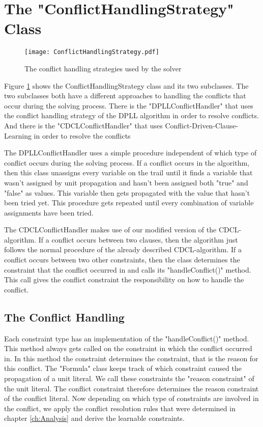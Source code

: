 \section{The "ConflictHandlingStrategy" Class}

\begin{figure}[htbp]
  \centering
  \texttt{[image: ConflictHandlingStrategy.pdf]}	
  \caption{The conflict handling strategies used by the solver}
  \label{fig:conflictHandling}
\end{figure}

Figure \ref{fig:conflictHandling} shows the ConflictHandlingStrategy class and its two subclasses. The two subclasses both have a different approaches to handling the conflicts that occur during the solving process. There is the "DPLLConflictHandler" that uses the conflict handling strategy of the DPLL algorithm in order to resolve conflicts. And there is the "CDCLConflictHandler" that uses Conflict-Driven-Clause-Learning in order to resolve the conflicts
\par
The DPLLConflictHandler uses a simple procedure independent of which type of conflict occurs during the solving process. If a conflict occurs in the algorithm, then this class unassigns every variable on the trail until it finds a variable that wasn't assigned by unit propagation and hasn't been assigned both "true" and "false" as values. This variable then gets propagated with the value that hasn't been tried yet. This procedure gets repeated until every combination of variable assignments have been tried.
\par
The CDCLConflictHandler makes use of our modified version of the CDCL-algorithm. If a conflict occurs between two clauses, then the algorithm just follows the normal procedure of the already described CDCL-algorithm. If a conflict occurs between two other constraints, then the class determines the constraint that the conflict occurred in and calls its "handleConflict()" method. This call gives the conflict constraint the responsibility on how to handle the conflict.

\subsection{The Conflict Handling}

Each constraint type has an implementation of the "handleConflict()" method. This method always gets called on the constraint in which the conflict occurred in. In this method the constraint determines the constraint, that is the reason for this conflict. The "Formula" class keeps track of which constraint caused the propagation of a unit literal. We call these constraints the "reason constraint" of the unit literal. The conflict constraint therefore determines the reason constraint of the conflict literal. Now depending on which type of constraints are involved in the conflict, we apply the conflict resolution rules that were determined in chapter \ref{ch:Analysis} and derive the learnable constraints.

